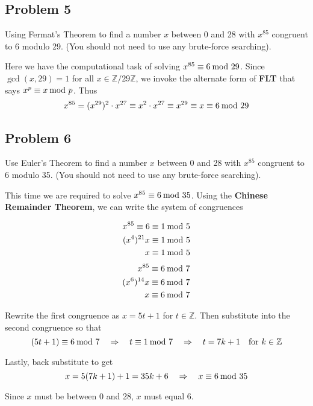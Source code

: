 \documentclass[../hw_sols.tex]{subfiles}
\begin{document}
\subsection*{Problem 5}

Using Fermat's Theorem to find a number $x$ between 0 and 28 with $x^{85}$ 
congruent to 6 modulo 29. (You should not need to use any brute-force 
searching).

\begin{solution}
Here we have the computational task of solving $x^{85} \equiv 6 \tmod{29}$. 
Since $\gcd(x,29) = 1$ for all $x \in \mathbb{Z}/29\mathbb{Z}$, we invoke 
the alternate form of \textbf{FLT} that says $x^p \equiv x \tmod{p}$. Thus 
	\[ x^{85} 
	= (x^{29})^2 \cdot x^{27} 
	\equiv x^2 \cdot x^{27} 
	\equiv x^{29} 
	\equiv x 
	\equiv 6 \tmod{29} \]
\end{solution}


\newpage



\subsection*{Problem 6}

Use Euler's Theorem to find a number $x$ between 0 and 28 with $x^{85}$ 
congruent to 6 modulo 35. (You should not need to use any brute-force 
searching).

\begin{solution}

This time we are required to solve $x^{85} \equiv 6 \tmod{35}$. Using the 
\textbf{Chinese Remainder Theorem}, we can write the system of congruences
\begin{multicols}{2}
\noindent
\begin{align*}
	x^{85} \equiv 6 &\equiv 1 \tmod{5} \\
	   (x^4)^{21} x &\equiv 1 \tmod{5} \\
	              x &\equiv 1 \tmod{5}
\end{align*}
\noindent
\begin{align*}
	      x^{85} &\equiv 6 \tmod{7} \\
	(x^6)^{14} x &\equiv 6 \tmod{7} \\
	           x &\equiv 6 \tmod{7}
\end{align*}
\end{multicols}

Rewrite the first congruence as $x = 5t + 1$ for $t \in \mathbb{Z}$. Then 
substitute into the second congruence so that
	\[ (5t + 1) \equiv 6 \tmod{7} 
	\quad \Rightarrow \quad 
	t \equiv 1 \tmod{7} 
	\quad \Rightarrow \quad 
	t = 7k + 1 \quad \text{for } k \in \mathbb{Z} \]

Lastly, back substitute to get
	\[ x = 5(7k + 1) + 1 = 35k + 6 
	\quad \Rightarrow \quad 
	x \equiv 6 \tmod{35} \]

Since $x$ must be between 0 and 28, $x$ must equal 6.

\end{solution}
\end{document}
